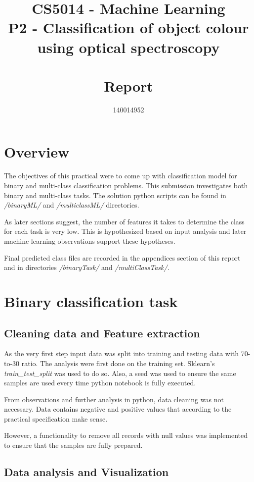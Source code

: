 \documentclass[11pt]{article}
\title{CS5014 - Machine Learning 
\\ \vspace{5mm} \Large P2 - Classification of object colour 
\\ using optical spectroscopy 
\\~\\ Report}
\author{140014952}
\begin{document}
	\maketitle

	\section{Overview}
		The objectives of this practical were to come up with classification model for binary and multi-class classification problems. This submission investigates both binary and multi-class tasks. The solution python scripts can be found in \textit{/binaryML/} and \textit{/multiclassML/} directories. 

		As later sections suggest, the number of features it takes to determine the class for each task is very low. This is hypothesized based on input analysis and later machine learning observations support these hypotheses. 

		Final predicted class files are recorded in the appendices section of this report and in directories \textit{/binaryTask/} and \textit{/multiClassTask/}.
	
	\clearpage
	\section{Binary classification task}

		\subsection{Cleaning data and Feature extraction}
			As the very first step input data was split into training and testing data with 70-to-30 ratio. The analysis were first done on the training set. Sklearn's \textit{train\_test\_split} was used to do so. Also, a seed was used to ensure the same samples are used every time python notebook is fully executed.

			From observations and further analysis in python, data cleaning was not necessary. Data contains negative and positive values that according to the practical specification make sense. 

			However, a functionality to remove all records with null values was implemented to ensure that the samples are fully prepared.

		\subsection{Data analysis and Visualization}
\end{document}
